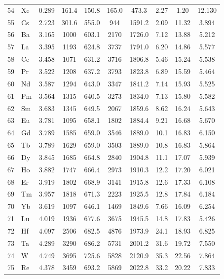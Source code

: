 \documentclass[11pt,a4paper]{article}
\begin{document}
\begin{longtable}{@{}llcccccccc@{}}
		54 & Xe  & 0.289 & 161.4  & 150.8  & 165.0  & 473.3  & 2.27  & 1.20  & 12.130 \\
		55 & Cs  & 2.723 & 301.6  & 555.0  & 944    & 1591.2 & 2.09  & 11.32 & 3.894 \\
		56 & Ba  & 3.165 & 1000   & 603.1  & 2170   & 1726.0 & 7.12  & 13.88 & 5.212 \\
		57 & La  & 3.395 & 1193   & 624.8  & 3737   & 1791.0 & 6.20  & 14.86 & 5.577 \\
		58 & Ce  & 3.458 & 1071   & 631.2  & 3716   & 1806.8 & 5.46  & 15.24 & 5.538 \\
		59 & Pr  & 3.522 & 1208   & 637.2  & 3793   & 1823.8 & 6.89  & 15.59 & 5.464 \\
		60 & Nd  & 3.587 & 1294   & 643.0  & 3347   & 1841.2 & 7.14  & 15.93 & 5.525 \\
		61 & Pm  & 3.564 & 1315   & 640.5  & 3273   & 1834.0 & 7.13  & 15.80 & 5.582 \\
		62 & Sm  & 3.683 & 1345   & 649.5  & 2067   & 1859.6 & 8.62  & 16.24 & 5.643 \\
		63 & Eu  & 3.781 & 1095   & 658.1  & 1802   & 1884.4 & 9.21  & 16.68 & 5.670 \\
		64 & Gd  & 3.789 & 1585   & 659.0  & 3546   & 1889.0 & 10.1  & 16.83 & 6.150 \\
		65 & Tb  & 3.789 & 1629   & 659.0  & 3503   & 1889.0 & 10.8  & 16.83 & 5.864 \\
		66 & Dy  & 3.845 & 1685   & 664.8  & 2840   & 1904.8 & 11.1  & 17.07 & 5.939 \\
		67 & Ho  & 3.882 & 1747   & 666.4  & 2973   & 1910.3 & 12.2  & 17.20 & 6.021 \\
		68 & Er  & 3.919 & 1802   & 668.9  & 3141   & 1915.8 & 12.6  & 17.33 & 6.108 \\
		69 & Tm  & 3.957 & 1818   & 671.3  & 2223   & 1925.5 & 12.8  & 17.84 & 6.184 \\
		70 & Yb  & 3.619 & 1097   & 646.1  & 1469   & 1849.6 & 7.66  & 16.09 & 6.254 \\
		71 & Lu  & 4.019 & 1936   & 677.6  & 3675   & 1945.5 & 14.8  & 17.83 & 5.426 \\
		72 & Hf  & 4.097 & 2506   & 682.5  & 4876   & 1973.9 & 24.1  & 18.93 & 6.825 \\
		73 & Ta  & 4.289 & 3290   & 686.2  & 5731   & 2001.2 & 31.6  & 19.72 & 7.550 \\
		74 & W   & 4.749 & 3695   & 725.6  & 5828   & 2120.9 & 35.3  & 22.56 & 7.864 \\
		75 & Re  & 4.378 & 3459   & 693.2  & 5869   & 2022.8 & 33.2  & 20.22 & 7.833 \\

\end{longtable}
\end{document}
